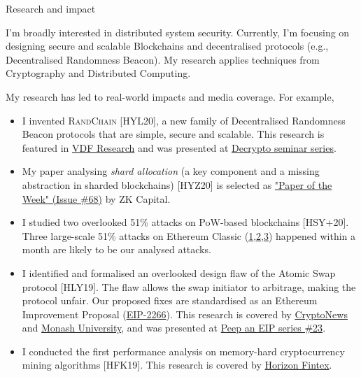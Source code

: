 \documentclass{resume} %
\begin{document}
\begin{rSection}{Research and impact}

    I'm broadly interested in distributed system security.
    Currently, I'm focusing on designing secure and scalable Blockchains and decentralised protocols (e.g., Decentralised Randomness Beacon).
    My research applies techniques from Cryptography and Distributed Computing.

    My research has led to real-world impacts and media coverage. For example,
    \begin{itemize}
        \item I invented \textsc{RandChain} [HYL20], a new family of Decentralised Randomness Beacon protocols that are simple, secure and scalable. This research is featured in \href{https://vdfresearch.org/}{VDF Research} and was presented at \href{https://decrypto.org/seminar/}{Decrypto seminar series}.
        \item My paper analysing \emph{shard allocation} (a key component and a missing abstraction in sharded blockchains) [HYZ20] is selected as \href{https://zkcapital.substack.com/}{"Paper of the Week" (Issue \#68)} by ZK Capital.
        \item I studied two overlooked 51\% attacks on PoW-based blockchains [HSY+20]. Three large-scale 51\% attacks on Ethereum Classic (\href{https://news.bitcoin.com/ethereum-classic-suffers-51-attack-again-delisting-risk-amplified}{1},\href{https://decrypt.co/40196/hackers-launch-third-51-attack-on-ethereum-classic-this-month}{2},\href{https://coingeek.com/over-1m-double-spent-in-latest-ethereum-classic-51-attack}{3}) happened within a month are likely to be our analysed attacks.
        \item I identified and formalised an overlooked design flaw of the Atomic Swap protocol [HLY19]. The flaw allows the swap initiator to arbitrage, making the protocol unfair. Our proposed fixes are standardised as an Ethereum Improvement Proposal (\href{https://github.com/ethereum/EIPs/issues/2266}{EIP-2266}). This research is covered by \href{https://cryptonews.com.au/monash-university-researchers-developing-cryptocurrency-transaction-platform}{CryptoNews} and \href{https://www.monash.edu/blockchain/news/to-realise-their-potential,-business-blockchains-must-learn-to-communicate}{Monash University}, and was presented at \href{https://www.youtube.com/watch?v=wwWcfl9N65k}{Peep an EIP series \#23}.
        \item I conducted the first performance analysis on memory-hard cryptocurrency mining algorithms [HFK19]. This research is covered by \href{https://medium.com/@horizonfintex/blockchain-research-bytes-1-9d023e080765}{Horizon Fintex}.
    \end{itemize}


\end{rSection}
\end{document}
